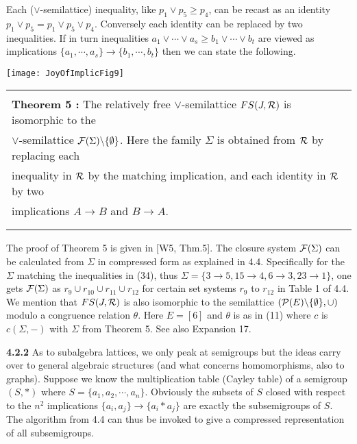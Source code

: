 \documentclass[11pt]{article}
\newcommand{\ra}{\rightarrow}
\begin{document}
 Each ($\vee$-semilattice) inequality, like $p_1 \vee p_5 \geq p_4$, can be recast as an identity $p_1 \vee p_5 = p_1 \vee p_5 \vee p_4$.  Conversely each identity can be replaced by two inequalities. If in turn inequalities $a_1 \vee \cdots \vee a_s \geq b_1 \vee \cdots \vee b_t$ are viewed as implications $\{a_1, \cdots, a_s \} \ra \{b_1, \cdots, b_t\}$ then we can state the following.
 
 
\begin{center}
\texttt{[image: JoyOfImplicFig9]}
\end{center}

\begin{tabular}{|l|} \hline \\
{\bf Theorem 5 :} The relatively free $\vee$-semilattice $FS(J, {\cal R})$ is isomorphic to the\\
$\vee$-semilattice ${\cal F}(\Sigma) \backslash \{\emptyset\}$. Here the family $\Sigma$ is obtained from ${\cal R}$ by replacing
each \\ 
inequality in ${\cal R}$ by the matching implication, and each identity in ${\cal R}$ by two\\
implications $A \ra B$ and $B \ra A$.\\
 \\ \\ \hline \end{tabular} 


The proof of Theorem 5 is given in [W5, Thm.5]. The closure system ${\cal F}(\Sigma)$ can be calculated from $\Sigma$ in compressed form as explained in 4.4. Specifically for the $\Sigma$ matching the inequalities in (34), thus $\Sigma = \{3 \ra 5, 15 \ra 4, 6 \ra 3, 23 \ra 1\}$, one gets ${\cal F}(\Sigma)$ as $r_9 \cup r_{10} \cup r_{11} \cup r_{12}$ for certain set systems $r_9$ to $r_{12}$ in Table 1 of 4.4.  We mention that $FS(J, {\cal R})$ is also isomorphic to the semilattice $({\cal P}(E) \backslash \{\emptyset\}, \cup )$ modulo a congruence relation $\theta$. Here $E = [6]$ and $\theta$ is as in (11) where $c$ is $c(\Sigma, -)$ with $\Sigma$ from Theorem 5.
See also Expansion 17.



{\bf 4.2.2} As to subalgebra lattices, we only peak at semigroups but the ideas carry over to general algebraic structures (and what concerns homomorphisms, also to graphs). Suppose we know the multiplication table (Cayley table) of a semigroup $(S, \ast)$ where $S = \{a_1, a_2, \cdots, a_n\}$. Obviously the subsets of $S$ closed with respect to the $n^2$ implications $\{a_i, a_j\} \ra \{a_i \ast a_j\}$ are exactly the subsemigroups of $S$. 
The algorithm from 4.4 can thus be invoked to give a compressed representation of all subsemigroups. 
\end{document}
